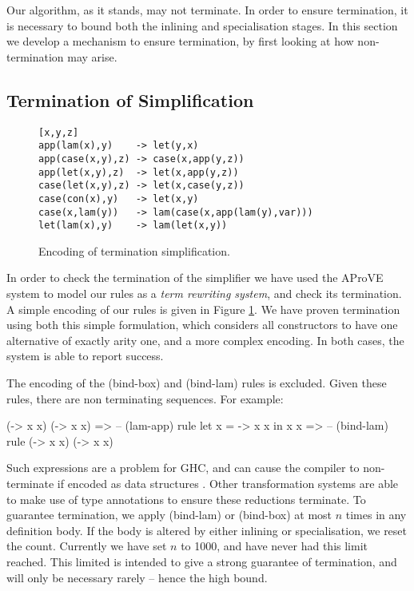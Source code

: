 Our algorithm, as it stands, may not terminate. In order to ensure termination, it is necessary to bound both the inlining and specialisation stages. In this section we develop a mechanism to ensure termination, by first looking at how non-termination may arise.

\subsection{Termination of Simplification}
\label{secF:termination_simplification}

\begin{figure}
\bigskip
\begin{verbatim}
[x,y,z]
app(lam(x),y)    -> let(y,x)
app(case(x,y),z) -> case(x,app(y,z))
app(let(x,y),z)  -> let(x,app(y,z))
case(let(x,y),z) -> let(x,case(y,z))
case(con(x),y)   -> let(x,y)
case(x,lam(y))   -> lam(case(x,app(lam(y),var)))
let(lam(x),y)    -> lam(let(x,y))
\end{verbatim}
\bigskip
\caption{Encoding of termination simplification.}
\label{figF:term_simplification}
\end{figure}

In order to check the termination of the simplifier we have used the AProVE system \cite{aprove} to model our rules as a \textit{term rewriting system}, and check its termination. A simple encoding of our rules is given in Figure \ref{figF:term_simplification}. We have proven termination using both this simple formulation, which considers all constructors to have one alternative of exactly arity one, and a more complex encoding. In both cases, the system is able to report success.

The encoding of the (bind-box) and (bind-lam) rules is excluded. Given these rules, there are non terminating sequences. For example:

\ignore\begin{code}
(\x -> x x) (\x -> x x)
   => -- (lam-app) rule
let x = \x -> x x in x x
   => -- (bind-lam) rule
(\x -> x x) (\x -> x x)
\end{code}

Such expressions are a problem for GHC, and can cause the compiler to non-terminate if encoded as data structures \cite{spj:inlining}. Other transformation systems \cite{chin:higher_order_removal} are able to make use of type annotations to ensure these reductions terminate. To guarantee termination, we apply (bind-lam) or (bind-box) at most $n$ times in any definition body. If the body is altered by either inlining or specialisation, we reset the count. Currently we have set $n$ to 1000, and have never had this limit reached. This limited is intended to give a strong guarantee of termination, and will only be necessary rarely -- hence the high bound.

